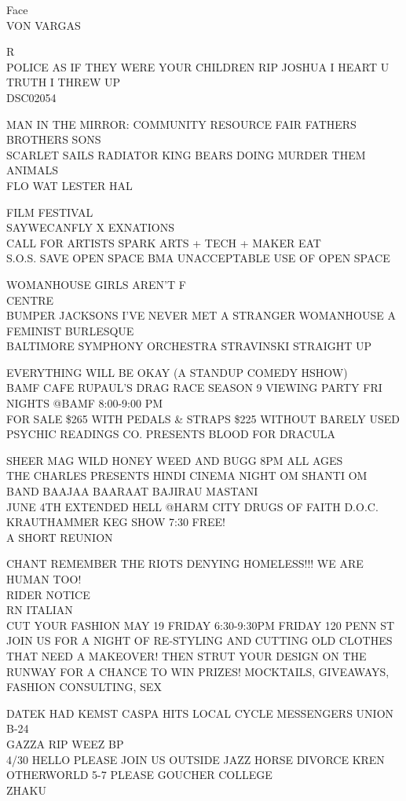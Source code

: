 \documentclass[10pt,letterpaper]{article}
\begin{document}
Face\\
VON VARGAS

R\\
POLICE AS IF THEY WERE YOUR CHILDREN RIP JOSHUA I HEART U\\
TRUTH I THREW UP\\
DSC02054

MAN IN THE MIRROR: COMMUNITY RESOURCE FAIR FATHERS BROTHERS SONS\\
SCARLET SAILS RADIATOR KING BEARS DOING MURDER THEM ANIMALS\\
FLO WAT LESTER HAL

FILM FESTIVAL\\
SAYWECANFLY X EXNATIONS\\
CALL FOR ARTISTS SPARK ARTS + TECH + MAKER EAT\\
S.O.S. SAVE OPEN SPACE BMA UNACCEPTABLE USE OF OPEN SPACE

WOMANHOUSE GIRLS AREN'T F\\
CENTRE\\
BUMPER JACKSONS I'VE NEVER MET A STRANGER WOMANHOUSE A FEMINIST BURLESQUE\\
BALTIMORE SYMPHONY ORCHESTRA STRAVINSKI STRAIGHT UP

EVERYTHING WILL BE OKAY (A STANDUP COMEDY HSHOW)\\
BAMF CAFE RUPAUL'S DRAG RACE SEASON 9 VIEWING PARTY FRI NIGHTS @BAMF 8:00{-}9:00 PM\\
FOR SALE \$265 WITH PEDALS \& STRAPS \$225 WITHOUT BARELY USED\\
PSYCHIC READINGS CO. PRESENTS BLOOD FOR DRACULA

SHEER MAG WILD HONEY WEED AND BUGG 8PM ALL AGES\\
THE CHARLES PRESENTS HINDI CINEMA NIGHT OM SHANTI OM BAND BAAJAA BAARAAT BAJIRAU MASTANI\\
JUNE 4TH EXTENDED HELL @HARM CITY DRUGS OF FAITH D.O.C. KRAUTHAMMER KEG SHOW 7:30 FREE!\\
A SHORT REUNION

CHANT REMEMBER THE RIOTS DENYING HOMELESS!!! WE ARE HUMAN TOO!\\
RIDER NOTICE\\
RN ITALIAN\\
CUT YOUR FASHION MAY 19 FRIDAY 6:30{-}9:30PM FRIDAY 120 PENN ST JOIN US FOR A NIGHT OF RE{-}STYLING AND CUTTING OLD CLOTHES THAT NEED A MAKEOVER!  THEN STRUT YOUR DESIGN ON THE RUNWAY FOR A CHANCE TO WIN PRIZES!  MOCKTAILS, GIVEAWAYS, FASHION CONSULTING, SEX

DATEK HAD KEMST CASPA HITS LOCAL CYCLE MESSENGERS UNION B{-}24\\
GAZZA RIP WEEZ BP\\
4/30 HELLO PLEASE JOIN US OUTSIDE JAZZ HORSE DIVORCE KREN OTHERWORLD 5{-}7 PLEASE GOUCHER COLLEGE\\
ZHAKU
\end{document}
